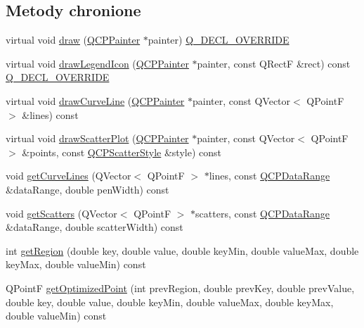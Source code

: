 \subsection*{Metody chronione}
\begin{DoxyCompactItemize}
\item 
virtual void \hyperlink{class_q_c_p_curve_ac199d41d23865cd68bd7b598308a4433}{draw} (\hyperlink{class_q_c_p_painter}{Q\+C\+P\+Painter} $\ast$painter) \hyperlink{qcustomplot_8hh_a42cc5eaeb25b85f8b52d2a4b94c56f55}{Q\+\_\+\+D\+E\+C\+L\+\_\+\+O\+V\+E\+R\+R\+I\+DE}
\item 
virtual void \hyperlink{class_q_c_p_curve_aac6e94afbce4002d2cd7793250154e84}{draw\+Legend\+Icon} (\hyperlink{class_q_c_p_painter}{Q\+C\+P\+Painter} $\ast$painter, const Q\+RectF \&rect) const \hyperlink{qcustomplot_8hh_a42cc5eaeb25b85f8b52d2a4b94c56f55}{Q\+\_\+\+D\+E\+C\+L\+\_\+\+O\+V\+E\+R\+R\+I\+DE}
\item 
virtual void \hyperlink{class_q_c_p_curve_a2d657f89bfb5a5da35a063dca997c583}{draw\+Curve\+Line} (\hyperlink{class_q_c_p_painter}{Q\+C\+P\+Painter} $\ast$painter, const Q\+Vector$<$ Q\+PointF $>$ \&lines) const 
\item 
virtual void \hyperlink{class_q_c_p_curve_a783b6188a81617380534e41539f55ed3}{draw\+Scatter\+Plot} (\hyperlink{class_q_c_p_painter}{Q\+C\+P\+Painter} $\ast$painter, const Q\+Vector$<$ Q\+PointF $>$ \&points, const \hyperlink{class_q_c_p_scatter_style}{Q\+C\+P\+Scatter\+Style} \&style) const 
\item 
void \hyperlink{class_q_c_p_curve_a90999a3378969ed08046395fa8fab37b}{get\+Curve\+Lines} (Q\+Vector$<$ Q\+PointF $>$ $\ast$lines, const \hyperlink{class_q_c_p_data_range}{Q\+C\+P\+Data\+Range} \&data\+Range, double pen\+Width) const 
\item 
void \hyperlink{class_q_c_p_curve_aaa0cc6dc484d2fc98ebaee4b121206fa}{get\+Scatters} (Q\+Vector$<$ Q\+PointF $>$ $\ast$scatters, const \hyperlink{class_q_c_p_data_range}{Q\+C\+P\+Data\+Range} \&data\+Range, double scatter\+Width) const 
\item 
int \hyperlink{class_q_c_p_curve_a8e0df32978cc526d2f3f0e342834bd4c}{get\+Region} (double key, double value, double key\+Min, double value\+Max, double key\+Max, double value\+Min) const 
\item 
Q\+PointF \hyperlink{class_q_c_p_curve_a4ed1566795ea51d519f9f0d17f0f131d}{get\+Optimized\+Point} (int prev\+Region, double prev\+Key, double prev\+Value, double key, double value, double key\+Min, double value\+Max, double key\+Max, double value\+Min) const 

\end{DoxyCompactItemize}
